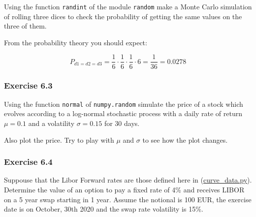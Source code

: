 \documentclass[11pt]{article}
\begin{document}
Using the function \texttt{randint} of the module \texttt{random} make a
Monte Carlo simulation of rolling three dices to check the probability
of getting the same values on the three of them.

From the probability theory you should expect:

\[P_{d1=d2=d3} = \frac{1}{6}\cdot\frac{1}{6}\cdot\frac{1}{6}\cdot 6 = \frac{1}{36} = 0.0278\]

    \hypertarget{exercise-6.3}{%
\subsubsection{Exercise 6.3}\label{exercise-6.3}}

Using the function \texttt{normal} of \texttt{numpy.random} simulate the
price of a stock which evolves according to a log-normal stochastic
process with a daily rate of return \(\mu=0.1\) and a volatility
\(\sigma=0.15\) for 30 days.

Also plot the price. Try to play with \(\mu\) and \(\sigma\) to see how
the plot changes.

    \hypertarget{exercise-6.4}{%
\subsubsection{Exercise 6.4}\label{exercise-6.4}}

Suppouse that the Libor Forward rates are those defined here in
(\href{https://repl.it/@MatteoSani/support6}{curve\_data.py}).
Determine the value of an option to pay a fixed rate of 4\% and receives
LIBOR on a 5 year swap starting in 1 year. Assume the notional is 100
EUR, the exercise date is on October, 30th 2020 and the swap rate
volatility is 15\%.


    
    
    
\end{document}

